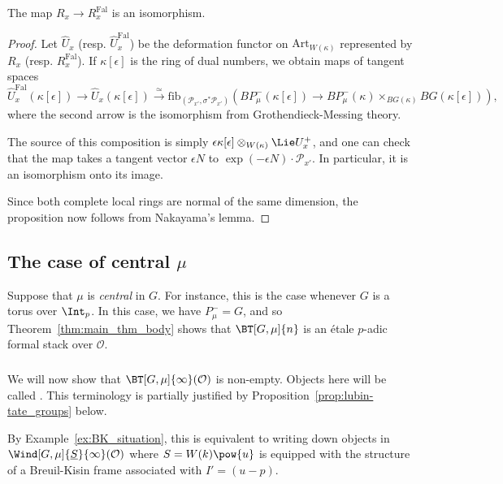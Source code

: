 \documentclass[10pt]{amsart}
\begin{document}
\begin{proposition}
\label{prop:faltings_def_rings}
The map $R_x\to R^{\mathrm{Fal}}_x$ is an isomorphism.
\end{proposition} 
\begin{proof}
Let $\widehat{U}_x$ (resp. $\widehat{U}^{\mathrm{Fal}}_x$) be the deformation functor on $\mathrm{Art}_{W(\kappa)}$ represented by $R_x$ (resp. $R_x^{\mathrm{Fal}}$). If $\kappa[\epsilon]$ is the ring of dual numbers, we obtain maps of tangent spaces
\[
\widehat{U}_x^{\mathrm{Fal}}(\kappa[\epsilon])\to \widehat{U}_x(\kappa[\epsilon])\xrightarrow{\simeq}\mathrm{fib}_{(\mathcal{P}_{x'},\sigma^*\mathcal{P}_{x'})}(BP^-_\mu(\kappa[\epsilon])\to BP^-_\mu(\kappa)\times_{BG(\kappa)}BG(\kappa[\epsilon])),
\]
where the second arrow is the isomorphism from Grothendieck-Messing theory.

The source of this composition is simply $\epsilon \kappa[\epsilon]\otimes_{W(\kappa)}\Lie U^+_x$, and one can check that the map takes a tangent vector $\epsilon N$ to $\exp(-\epsilon N)\cdot \mathcal{P}_{x'}$. In particular, it is an isomorphism onto its image.

Since both complete local rings are normal of the same dimension, the proposition now follows from Nakayama's lemma.
\end{proof}




\subsection{The case of central $\mu$}
\label{subsec:central}

Suppose that $\mu$ is \emph{central} in $G$. For instance, this is the case whenever $G$ is a torus over $\Int_p$. In this case, we have $P^-_\mu = G$, and so Theorem~\ref{thm:main_thm_body} shows that $\BT[G,\mu]{n}$ is an \'etale $p$-adic formal stack over $\mathcal{O}$. 

\subsubsection{}
We will now show that $\BT[G,\mu]{\infty}(\mathcal{O})$ is non-empty. Objects here will be called . This terminology is partially justified by  Proposition~\ref{prop:lubin-tate_groups} below.

By Example~\ref{ex:BK_situation}, this is equivalent to writing down objects in $\Wind[G,\mu]{\underline{S}}{\infty}(\mathcal{O})$ where $S = W(k)\pow{u}$ is equipped with the structure of a Breuil-Kisin frame associated with $I' = (u-p)$.
\end{document}
